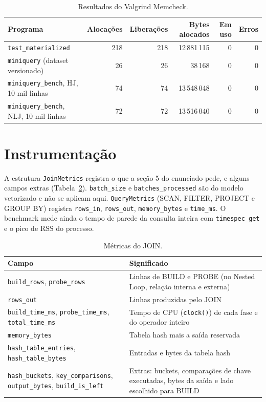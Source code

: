 \documentclass[11pt,a4paper]{article}
\begin{document}
\begin{table}[H]
\centering
\small
\begin{tabular}{@{}lrrrrr@{}}
\toprule
Programa & Alocações & Liberações & Bytes alocados & Em uso & Erros \\
\midrule
\texttt{test\_materialized} & 218 & 218 & 12\,881\,115 & 0 & 0 \\
\texttt{miniquery} (dataset versionado) & 26 & 26 & 38\,168 & 0 & 0 \\
\texttt{miniquery\_bench}, HJ, 10 mil linhas & 74 & 74 & 13\,548\,048 & 0 & 0 \\
\texttt{miniquery\_bench}, NLJ, 10 mil linhas & 72 & 72 & 13\,516\,040 & 0 & 0 \\
\bottomrule
\end{tabular}
\caption{Resultados do Valgrind Memcheck.}
\label{tab:valgrind}
\end{table}

\section{Instrumentação}
A estrutura \texttt{JoinMetrics} registra o que a seção 5 do enunciado pede, e alguns campos extras (Tabela~\ref{tab:metricas}). \texttt{batch\_size} e \texttt{batches\_processed} são do modelo vetorizado e não se aplicam aqui. \texttt{QueryMetrics} (SCAN, FILTER, PROJECT e GROUP BY) registra \texttt{rows\_in}, \texttt{rows\_out}, \texttt{memory\_bytes} e \texttt{time\_ms}. O benchmark mede ainda o tempo de parede da consulta inteira com \texttt{timespec\_get} e o pico de RSS do processo.

\begin{table}[H]
\centering
\small
\begin{tabular}{@{}p{6.4cm}p{10.0cm}@{}}
\toprule
Campo & Significado \\
\midrule
\texttt{build\_rows}, \texttt{probe\_rows} & Linhas de BUILD e PROBE (no Nested Loop, relação interna e externa) \\
\texttt{rows\_out} & Linhas produzidas pelo JOIN \\
\texttt{build\_time\_ms}, \texttt{probe\_time\_ms}, \texttt{total\_time\_ms} & Tempo de CPU (\texttt{clock()}) de cada fase e do operador inteiro \\
\texttt{memory\_bytes} & Tabela hash mais a saída reservada \\
\texttt{hash\_table\_entries}, \texttt{hash\_table\_bytes} & Entradas e bytes da tabela hash \\
\texttt{hash\_buckets}, \texttt{key\_comparisons}, \texttt{output\_bytes}, \texttt{build\_is\_left} & Extras: buckets, comparações de chave executadas, bytes da saída e lado escolhido para BUILD \\
\bottomrule
\end{tabular}
\caption{Métricas do JOIN.}
\label{tab:metricas}
\end{table}
\end{document}
